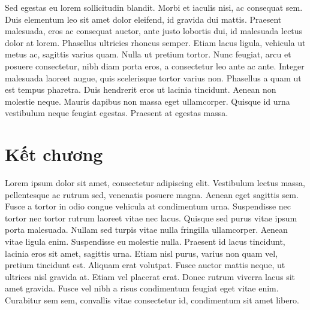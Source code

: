 Sed egestas eu lorem sollicitudin blandit. Morbi et iaculis nisi, ac consequat sem. Duis elementum leo sit amet dolor eleifend, id gravida dui mattis. Praesent malesuada, eros ac consequat auctor, ante justo lobortis dui, id malesuada lectus dolor at lorem. Phasellus ultricies rhoncus semper. Etiam lacus ligula, vehicula ut metus ac, sagittis varius quam. Nulla ut pretium tortor. Nunc feugiat, arcu et posuere consectetur, nibh diam porta eros, a consectetur leo ante ac ante. Integer malesuada laoreet augue, quis scelerisque tortor varius non. Phasellus a quam ut est tempus pharetra. Duis hendrerit eros ut lacinia tincidunt. Aenean non molestie neque. Mauris dapibus non massa eget ullamcorper. Quisque id urna vestibulum neque feugiat egestas. Praesent at egestas massa.

\section{Kết chương}
Lorem ipsum dolor sit amet, consectetur adipiscing elit. Vestibulum lectus massa, pellentesque ac rutrum sed, venenatis posuere magna. Aenean eget sagittis sem. Fusce a tortor in odio congue vehicula at condimentum urna. Suspendisse nec tortor nec tortor rutrum laoreet vitae nec lacus. Quisque sed purus vitae ipsum porta malesuada. Nullam sed turpis vitae nulla fringilla ullamcorper. Aenean vitae ligula enim. Suspendisse eu molestie nulla. Praesent id lacus tincidunt, lacinia eros sit amet, sagittis urna. Etiam nisl purus, varius non quam vel, pretium tincidunt est. Aliquam erat volutpat. Fusce auctor mattis neque, ut ultrices nisl gravida at. Etiam vel placerat erat. Donec rutrum viverra lacus sit amet gravida. Fusce vel nibh a risus condimentum feugiat eget vitae enim. Curabitur sem sem, convallis vitae consectetur id, condimentum sit amet libero.

